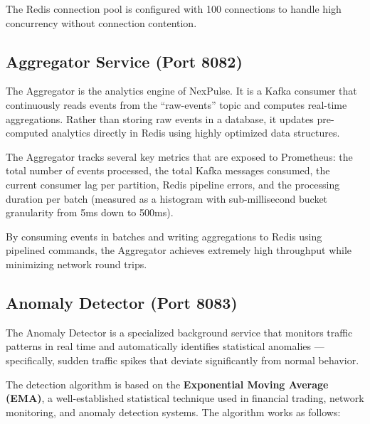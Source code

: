 \documentclass[12pt,a4paper]{article}
\begin{document}
The Redis connection pool is configured with 100 connections to handle high concurrency without connection contention.

\subsection{Aggregator Service (Port 8082)}

The Aggregator is the analytics engine of NexPulse. It is a Kafka consumer that continuously reads events from the ``raw-events'' topic and computes real-time aggregations. Rather than storing raw events in a database, it updates pre-computed analytics directly in Redis using highly optimized data structures.

The Aggregator tracks several key metrics that are exposed to Prometheus: the total number of events processed, the total Kafka messages consumed, the current consumer lag per partition, Redis pipeline errors, and the processing duration per batch (measured as a histogram with sub-millisecond bucket granularity from 5ms down to 500ms).

By consuming events in batches and writing aggregations to Redis using pipelined commands, the Aggregator achieves extremely high throughput while minimizing network round trips.

\subsection{Anomaly Detector (Port 8083)}

The Anomaly Detector is a specialized background service that monitors traffic patterns in real time and automatically identifies statistical anomalies --- specifically, sudden traffic spikes that deviate significantly from normal behavior.

The detection algorithm is based on the \textbf{Exponential Moving Average (EMA)}, a well-established statistical technique used in financial trading, network monitoring, and anomaly detection systems. The algorithm works as follows:
\end{document}
